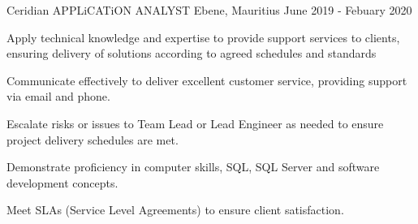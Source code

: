 \begin{cventries}
  \cventry
    {Ceridian} %
    {APPLiCATiON ANALYST} %
    {Ebene, Mauritius} %
    {June 2019 ‑ Febuary 2020} %
    {
      \begin{cvitems} %
        \item {Apply technical knowledge and expertise to provide support services to clients, ensuring delivery of solutions according to agreed schedules
        and standards}
        \item {Communicate effectively to deliver excellent customer service, providing support via email and phone.}
        \item {Escalate risks or issues to Team Lead or Lead Engineer as needed to ensure project delivery schedules are met.}
        \item {Demonstrate proficiency in computer skills, SQL, SQL Server and software development concepts.}
        \item {Meet SLAs (Service Level Agreements) to ensure client satisfaction.}
      \end{cvitems}
    }

\end{cventries}
